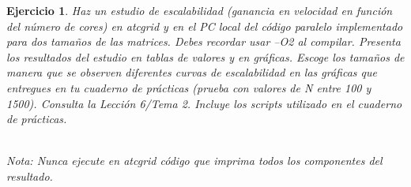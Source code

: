 \documentclass[11pt]{article}
\theoremstyle{definition-style}
\newtheorem{ejer}{Ejercicio}
\begin{document}
\begin{ejer}
    Haz un estudio de escalabilidad (ganancia en velocidad en función del número de cores) en atcgrid y en el PC local del código paralelo implementado para dos tamaños de las matrices. Debes recordar usar –O2 al compilar. Presenta los resultados del estudio en tablas de valores y en gráficas. Escoge los tamaños de manera que se observen diferentes curvas de escalabilidad en las gráficas que entregues en tu cuaderno de prácticas (prueba con valores de N entre 100 y 1500). Consulta la Lección 6/Tema 2. Incluye los scripts utilizado en el cuaderno de prácticas. 
    
    \hfill\\
    \textit{Nota:} \small Nunca ejecute en atcgrid código que imprima todos los componentes del resultado.
    
\end{ejer}

\end{document}
